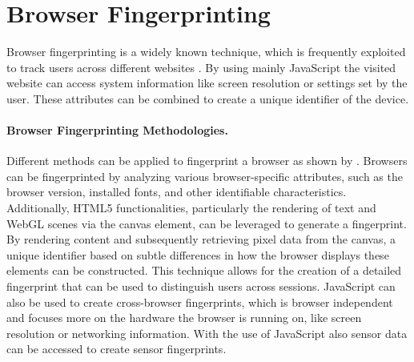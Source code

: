 \documentclass[11pt,
  oneside,openany,    %
]{scrreprt}
\begin{document}
\section{Browser Fingerprinting}
\label{sec:browser_fingerprint}
Browser fingerprinting is a widely known technique, which is frequently exploited to track users across different websites \cite{DBLP:conf/secrypt/PolcakSMHM23}.
By using mainly JavaScript the visited website can access system information like screen resolution or settings set by the user.
These attributes can be combined to create a unique identifier of the device.

\paragraph{Browser Fingerprinting Methodologies.}
\label{par:browser_fingerprint}
Different methods can be applied to fingerprint a browser as shown by \citeauthor{DBLP:conf/ntms/UpathilakeLM15} \cite{DBLP:conf/ntms/UpathilakeLM15}.
Browsers can be fingerprinted by analyzing various browser-specific attributes, such as the browser version, installed fonts, and other identifiable characteristics.
Additionally, HTML5 functionalities, particularly the rendering of text and WebGL scenes via the canvas element, can be leveraged to generate a fingerprint.
By rendering content and subsequently retrieving pixel data from the canvas, a unique identifier based on subtle differences in how the browser displays these elements can be constructed.
This technique allows for the creation of a detailed fingerprint that can be used to distinguish users across sessions.
JavaScript can also be used to create cross-browser fingerprints, which is browser independent and focuses more on the hardware the browser is running on, like screen resolution or networking information.
With the use of JavaScript also sensor data can be accessed to create sensor fingerprints.
\end{document}
